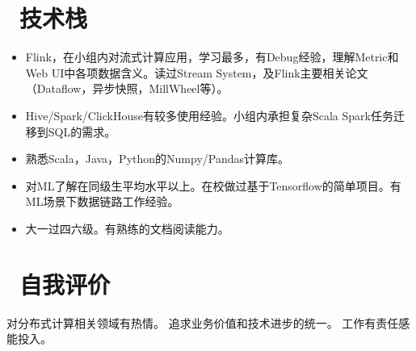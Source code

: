 \documentclass{resume}
\begin{document}
\section{\faCogs\ 技术栈}
\begin{itemize}[parsep=0.5ex]
  \item Flink，在小组内对流式计算应用，学习最多，有Debug经验，理解Metric和Web UI中各项数据含义。读过Stream System，及Flink主要相关论文（Dataflow，异步快照，MillWheel等）。
  \item Hive/Spark/ClickHouse有较多使用经验。小组内承担复杂Scala Spark任务迁移到SQL的需求。
  \item 熟悉Scala，Java，Python的Numpy/Pandas计算库。
  \item 对ML了解在同级生平均水平以上。在校做过基于Tensorflow的简单项目。有ML场景下数据链路工作经验。
  \item 大一过四六级。有熟练的文档阅读能力。

  
\end{itemize}

\section{\faInfo\ 自我评价}
\begin{onehalfspacing}
对分布式计算相关领域有热情。
追求业务价值和技术进步的统一。
工作有责任感能投入。
\end{onehalfspacing}

%
%
\end{document}

